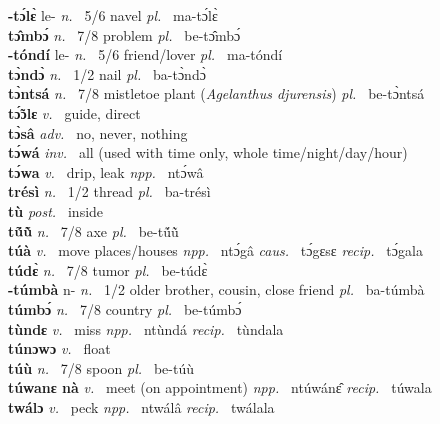 {\bfseries -tɔ́lɛ̀} le- {\itshape n.~} 5/6 navel {\itshape pl.~} ma-tɔ́lɛ̀    \\ 
{\bfseries tɔ̂mbɔ́}  {\itshape n.~} 7/8 problem {\itshape pl.~} be-tɔ̂mbɔ́    \\ 
{\bfseries -tóndí} le- {\itshape n.~} 5/6 friend/lover {\itshape pl.~} ma-tóndí    \\ 
{\bfseries tɔ̀ndɔ̀}  {\itshape n.~} 1/2 nail {\itshape pl.~} ba-tɔ̀ndɔ̀   \\ 
{\bfseries tɔ̀ntsá}  {\itshape n.~} 7/8 mistletoe plant ({\itshape Agelanthus djurensis}) {\itshape pl.~} be-tɔ̀ntsá    \\ 
{\bfseries tɔ̃́ɔlɛ}  {\itshape v.~} guide, direct    \\ 
{\bfseries tɔ̀sâ}  {\itshape adv.~} no, never, nothing    \\ 
{\bfseries tɔ́wá}  {\itshape inv.~} all (used with time only, whole time/night/day/hour)    \\ 
{\bfseries tɔ́wa}  {\itshape v.~} drip, leak   {\itshape npp.~} ntɔ́wâ  \\ 
{\bfseries trésì}  {\itshape n.~} 1/2 thread {\itshape pl.~} ba-trésì    \\ 
{\bfseries tù}  {\itshape post.~} inside    \\ 
{\bfseries tṹũ̀}  {\itshape n.~} 7/8 axe {\itshape pl.~} be-tṹũ̀    \\ 
{\bfseries túà}  {\itshape v.~} move places/houses   {\itshape npp.~} ntɔ́gâ {\itshape caus.~} tɔ́gɛsɛ {\itshape recip.~} tɔ́gala  \\ 
{\bfseries túdɛ̀}  {\itshape n.~} 7/8 tumor {\itshape pl.~} be-túdɛ̀    \\ 
{\bfseries -túmbà} n- {\itshape n.~} 1/2 older brother, cousin, close friend {\itshape pl.~} ba-túmbà    \\ 
{\bfseries túmbɔ́}  {\itshape n.~} 7/8 country {\itshape pl.~} be-túmbɔ́   \\ 
{\bfseries tùndɛ}  {\itshape v.~} miss   {\itshape npp.~} ntùndá {\itshape recip.~} tùndala  \\ 
{\bfseries túnɔwɔ}  {\itshape v.~} float    \\ 
{\bfseries túù}  {\itshape n.~} 7/8 spoon {\itshape pl.~} be-túù    \\ 
{\bfseries túwanɛ nà}  {\itshape v.~} meet (on appointment)   {\itshape npp.~} ntúwánɛ̂ {\itshape recip.~} túwala  \\ 
{\bfseries twálɔ}  {\itshape v.~} peck   {\itshape npp.~} ntwálâ {\itshape recip.~} twálala  \\ 


